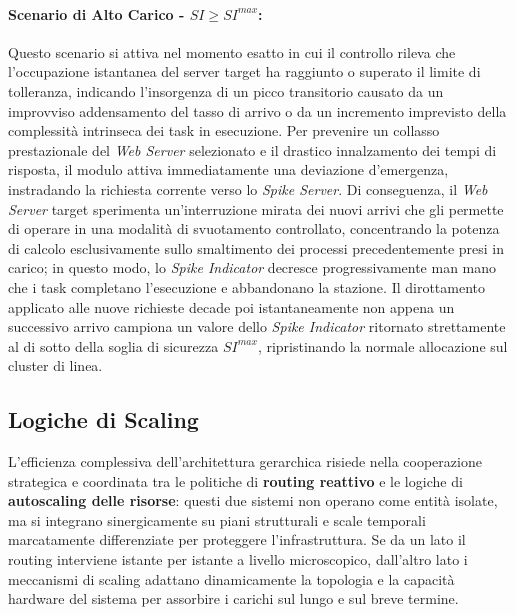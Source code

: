 ﻿\documentclass[a4paper,12pt]{article}
\begin{document}
\paragraph{Scenario di Alto Carico - $SI \ge SI^{max}$:}
Questo scenario si attiva nel momento esatto in cui il controllo rileva che l'occupazione istantanea del server target ha raggiunto o superato il limite di tolleranza, indicando l'insorgenza di un picco transitorio causato da un improvviso addensamento del tasso di arrivo o da un incremento imprevisto della complessità intrinseca dei task in esecuzione. Per prevenire un collasso prestazionale del \textit{Web Server} selezionato e il drastico innalzamento dei tempi di risposta, il modulo attiva immediatamente una deviazione d'emergenza, instradando la richiesta corrente verso lo \textit{Spike Server}. Di conseguenza, il \textit{Web Server} target sperimenta un'interruzione mirata dei nuovi arrivi che gli permette di operare in una modalità di svuotamento controllato, concentrando la potenza di calcolo esclusivamente sullo smaltimento dei processi precedentemente presi in carico; in questo modo, lo \textit{Spike Indicator} decresce progressivamente man mano che i task completano l'esecuzione e abbandonano la stazione. Il dirottamento applicato alle nuove richieste decade poi istantaneamente non appena un successivo arrivo campiona un valore dello \textit{Spike Indicator} ritornato strettamente al di sotto della soglia di sicurezza $SI^{max}$, ripristinando la normale allocazione sul cluster di linea.


\subsection{Logiche di Scaling}
L'efficienza complessiva dell'architettura gerarchica risiede nella cooperazione strategica e coordinata tra le politiche di \textbf{routing reattivo} e le logiche di \textbf{autoscaling delle risorse}: questi due sistemi non operano come entità isolate, ma si integrano sinergicamente su piani strutturali e scale temporali marcatamente differenziate per proteggere l'infrastruttura. Se da un lato il routing interviene istante per istante a livello microscopico, dall'altro lato i meccanismi di scaling adattano dinamicamente la topologia e la capacità hardware del sistema per assorbire i carichi sul lungo e sul breve termine.
\end{document}
